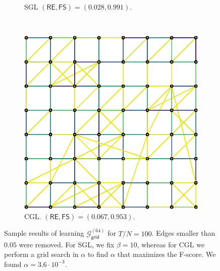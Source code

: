 \begin{figure}[!htb]
\begin{subfigure}[b]{0.3\textwidth}
        \caption{\textsf{SGL} $(\mathsf{RE}, \mathsf{FS}) = (0.028, 0.991)$.}
    \end{subfigure}
    ~
    \begin{subfigure}[b]{0.3\textwidth}
        \includegraphics[width=\textwidth]{grid/cgl_grid.eps}
        \caption{\textsf{CGL}. $(\mathsf{RE}, \mathsf{FS}) = (0.067, 0.953)$.}
    \end{subfigure}
    \caption{Sample results of learning $\mathcal{G}^{(64)}_{\mathsf{grid}}$ for $T/N = 100$. Edges smaller than $0.05$ were removed.
    For \textsf{SGL}, we fix $\beta = 10$, whereas for \textsf{CGL} we perform a grid search in $\alpha$ to find $\alpha$ that maximizes the F-score.
    We found $\alpha = 3.6\cdot 10^{-3}$.}
    \label{fig:sample-grid}
\end{figure}

